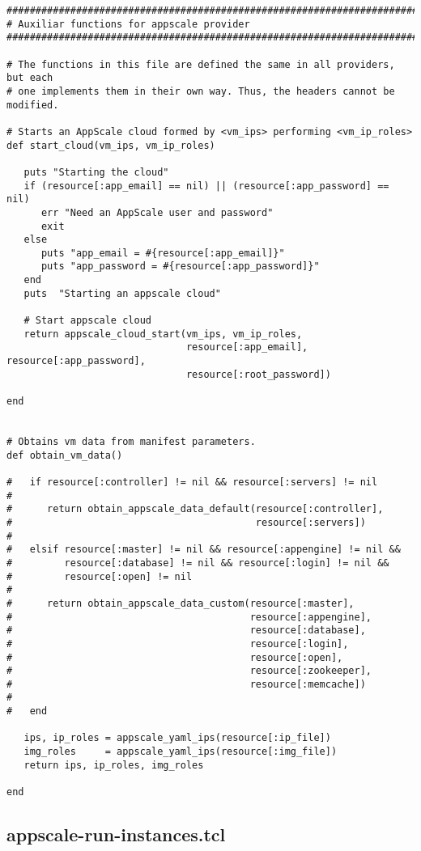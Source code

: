 \begin{lstlisting}
################################################################################
# Auxiliar functions for appscale provider
################################################################################

# The functions in this file are defined the same in all providers, but each
# one implements them in their own way. Thus, the headers cannot be modified.

# Starts an AppScale cloud formed by <vm_ips> performing <vm_ip_roles>
def start_cloud(vm_ips, vm_ip_roles)

   puts "Starting the cloud"
   if (resource[:app_email] == nil) || (resource[:app_password] == nil)
      err "Need an AppScale user and password"
      exit
   else
      puts "app_email = #{resource[:app_email]}"
      puts "app_password = #{resource[:app_password]}"
   end
   puts  "Starting an appscale cloud"
   
   # Start appscale cloud
   return appscale_cloud_start(vm_ips, vm_ip_roles,
                               resource[:app_email], resource[:app_password],
                               resource[:root_password])

end


# Obtains vm data from manifest parameters.
def obtain_vm_data()

#   if resource[:controller] != nil && resource[:servers] != nil
#
#      return obtain_appscale_data_default(resource[:controller],
#                                          resource[:servers])
#
#   elsif resource[:master] != nil && resource[:appengine] != nil &&
#         resource[:database] != nil && resource[:login] != nil &&
#         resource[:open] != nil
#
#      return obtain_appscale_data_custom(resource[:master],
#                                         resource[:appengine],
#                                         resource[:database],
#                                         resource[:login],
#                                         resource[:open],
#                                         resource[:zookeeper],
#                                         resource[:memcache])
#
#   end

   ips, ip_roles = appscale_yaml_ips(resource[:ip_file])
   img_roles     = appscale_yaml_ips(resource[:img_file])
   return ips, ip_roles, img_roles
   
end
\end{lstlisting}


\subsection{appscale-run-instances.tcl}


